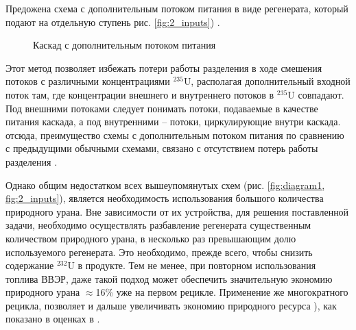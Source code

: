 Предожена схема с дополнительным потоком питания в виде регенерата, который подают на отдельную ступень рис. \ref{fig:2_inputs}) \cite{sulaberidzeQuasiidealCascadesAdditional2006}.
\begin{figure}[ht]
  \caption{Каскад с дополнительным потоком питания}
\end{figure}

Этот метод позволяет избежать потери работы разделения в ходе смешения потоков с различными концентрациями $^{235}$U, располагая дополнительный входной поток там, где концентрации внешнего и внутреннего потоков в $^{235}$U совпадают. Под внешними потоками следует понимать потоки, подаваемые в качестве питания каскада, а под внутренними -- потоки, циркулирующие внутри каскада. отсюда, преимущество схемы с дополнительным потоком питания по сравнению с предыдущими обычными схемами, связано с отсутствием потерь работы разделения \cite{smirnovKaskadnyeShemyZadachah2012, sulaberidzeQuasiidealCascadesAdditional2006}.

Однако общим недостатком всех вышеупомянутых схем (рис. \ref{fig:diagram1, fig:2_inputs}), является необходимость использования большого количества природного урана.
Вне зависимости от их устройства, для решения поставленной задачи, необходимо осуществлять разбавление регенерата существенным количеством природного урана, в несколько раз превышающим долю используемого регенерата. Это необходимо, прежде всего, чтобы снизить содержание $^{232}$U в продукте.
Тем не менее, при повторном использования топлива ВВЭР, даже такой подход может обеспечить значительную экономию природного урана $\approx$16\% уже на первом рецикле.
Применение же многократного рецикла, позволяет и дальше увеличивать экономию природного ресурса \cite{colemanEvaluationMultipleSelfrecycling2010}), как показано в оценках в \cite{smirnovEvolutionIsotopicComposition2012}.

